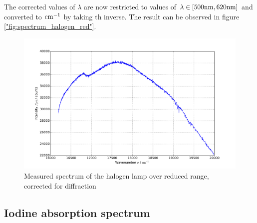 The corrected values of $\lambda$ are now restricted to values of 
$\lambda \in [500\mathrm{nm}, 620\mathrm{nm}]$ and converted to $\mathrm{cm^{-1}}$ by taking th inverse. The result 
can be observed in figure \ref{"fig:spectrum_halogen_red"}.
\begin{figure}
\centering
\includegraphics[width=\pltw]{analysis/figures/halogen_red.pdf}
\caption{Measured spectrum of the halogen lamp over reduced range, corrected for diffraction}
\label{fig:spectrum_halogen_red}
\end{figure}

\FloatBarrier

\subsection{Iodine absorption spectrum}

